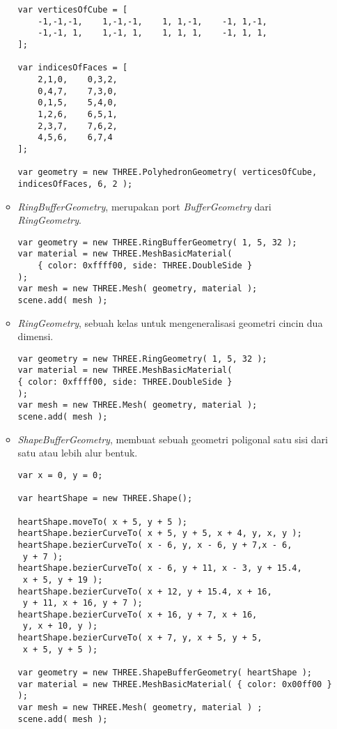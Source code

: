 \begin{itemize}
\begin{itemize}
\begin{lstlisting}
var verticesOfCube = [
    -1,-1,-1,    1,-1,-1,    1, 1,-1,    -1, 1,-1,
    -1,-1, 1,    1,-1, 1,    1, 1, 1,    -1, 1, 1,
];

var indicesOfFaces = [
    2,1,0,    0,3,2,
    0,4,7,    7,3,0,
    0,1,5,    5,4,0,
    1,2,6,    6,5,1,
    2,3,7,    7,6,2,
    4,5,6,    6,7,4
];

var geometry = new THREE.PolyhedronGeometry( verticesOfCube, 
indicesOfFaces, 6, 2 );
\end{lstlisting}

	\item {\it RingBufferGeometry}, merupakan port {\it BufferGeometry} dari {\it RingGeometry}.
	
\begin{lstlisting}
var geometry = new THREE.RingBufferGeometry( 1, 5, 32 );
var material = new THREE.MeshBasicMaterial( 
	{ color: 0xffff00, side: THREE.DoubleSide } 
);
var mesh = new THREE.Mesh( geometry, material );
scene.add( mesh );
\end{lstlisting}

	\item {\it RingGeometry}, sebuah kelas untuk mengeneralisasi geometri cincin dua dimensi.
	
\begin{lstlisting}
var geometry = new THREE.RingGeometry( 1, 5, 32 );
var material = new THREE.MeshBasicMaterial( 
{ color: 0xffff00, side: THREE.DoubleSide } 
);
var mesh = new THREE.Mesh( geometry, material );
scene.add( mesh );
\end{lstlisting}

	\item {\it ShapeBufferGeometry}, membuat sebuah geometri poligonal satu sisi dari satu atau lebih alur bentuk.
	
\begin{lstlisting}
var x = 0, y = 0;

var heartShape = new THREE.Shape();

heartShape.moveTo( x + 5, y + 5 );
heartShape.bezierCurveTo( x + 5, y + 5, x + 4, y, x, y );
heartShape.bezierCurveTo( x - 6, y, x - 6, y + 7,x - 6,
 y + 7 );
heartShape.bezierCurveTo( x - 6, y + 11, x - 3, y + 15.4,
 x + 5, y + 19 );
heartShape.bezierCurveTo( x + 12, y + 15.4, x + 16,
 y + 11, x + 16, y + 7 );
heartShape.bezierCurveTo( x + 16, y + 7, x + 16,
 y, x + 10, y );
heartShape.bezierCurveTo( x + 7, y, x + 5, y + 5,
 x + 5, y + 5 );

var geometry = new THREE.ShapeBufferGeometry( heartShape );
var material = new THREE.MeshBasicMaterial( { color: 0x00ff00 } );
var mesh = new THREE.Mesh( geometry, material ) ;
scene.add( mesh );
\end{lstlisting}


\end{itemize}
\end{itemize}
